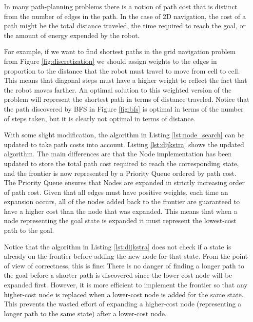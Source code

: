 In many path-planning problems there is a notion of path cost that is
distinct from the number of edges in the path.  In the case of 2D
navigation, the cost of a path might be the total distance traveled,
the time required to reach the goal, or the amount of energy expended
by the robot.

For example, if we want to find shortest paths in the grid navigation
problem from Figure \ref{fig:discretization} we should assign weights
to the edges in proportion to the distance that the robot must travel
to move from cell to cell.  This means that diagonal steps must have a
higher weight to reflect the fact that the robot moves farther.  An
optimal solution to this weighted version of the problem will
represent the shortest path in terms of distance traveled.  Notice
that the path discovered by BFS in Figure \ref{fig:bfs} is optimal in
terms of the number of steps taken, but it is clearly not optimal in
terms of distance.

With some slight modification, the algorithm in Listing
\ref{lst:node_search} can be updated to take path costs into account.
Listing \ref{lst:dijkstra} shows the updated algorithm.  The main
differences are that the Node implementation has been updated to store
the total path cost required to reach the corresponding state, and the
frontier is now represented by a Priority Queue ordered by path cost.
The Priority Queue ensures that Nodes are expanded in strictly
increasing order of path cost.  Given that all edges must have
positive weights, each time an expansion occurs, all of the nodes
added back to the frontier are guaranteed to have a higher cost than
the node that was expanded.  This means that when a node representing
the goal state is expanded it must represent the lowest-cost path to
the goal.
 
Notice that the algorithm in Listing \ref{lst:dijkstra} does not check
if a state is already on the frontier before adding the new node for
that state.  From the point of view of correctness, this is fine:
There is no danger of finding a longer path to the goal before a
shorter path is discovered since the lower-cost node will be expanded
first.  However, it is more efficient to implement the frontier so
that any higher-cost node is replaced when a lower-cost node is added
for the same state.  This prevents the wasted effort of expanding a
higher-cost node (representing a longer path to the same state) after
a lower-cost node.


